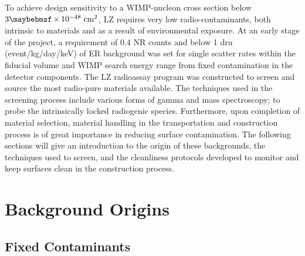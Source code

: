 To achieve design sensitivity to a WIMP-nucleon cross section below $ 3 \times 10^{-48} \; \MathText{cm}^{2}$, LZ requires very low radio-contaminants, both intrinsic to materials and as a result of environmental exposure. At an early stage of the project, a requirement of 0.4 NR counts and below 1 \micro{}dru (event/kg/day/keV) of ER background was set for single scatter rates within the fiducial volume and WIMP search energy range from fixed contamination in the detector components. The LZ radioassay program was constructed to screen and source the most radio-pure materials available. The techniques used in the screening process include various forms of gamma and mass spectroscopy; to probe the intrinsically locked radiogenic species. Furthermore, upon completion of material selection, material handling in the transportation and construction process is of great importance in reducing surface contamination. The following sections will give an introduction to the origin of these backgrounds, the techniques used to screen, and the cleanliness protocols developed to monitor and keep surfaces clean in the construction process. 

\section{Background Origins}
\label{sec:background_origins}

\subsection{Fixed Contaminants}
\label{subsec:fixed_contaminants}

